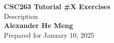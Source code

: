 \begin{titlepage}
    \null %
    \vfill
    \begin{center}
        {\fontsize{35}{48}\selectfont \bfseries CSC263 Tutorial \#X Exercises}
        \vspace{20pt} \\
        {\LARGE Description} \\
        \vspace{20pt}
        \textbf{Alexander He Meng}
        \vspace{8pt}
        \\ Prepared for January 10, 2025
    \end{center}
    \vfill
\end{titlepage}
